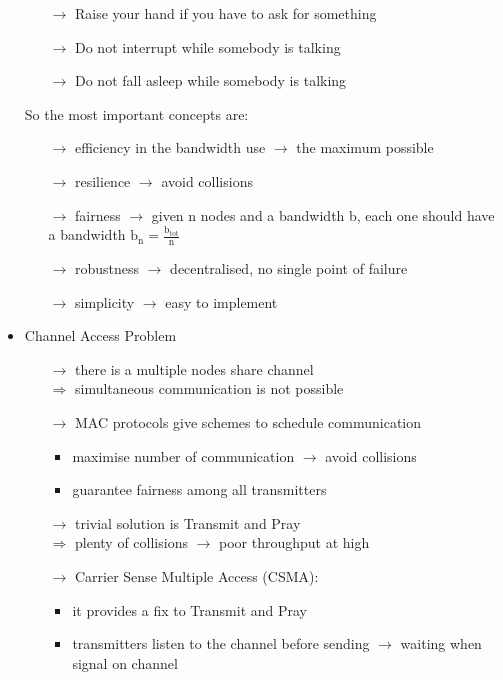 \begin{itemize}
\begin{itemize}
        \item[$\rightarrow$] Raise your hand if you have to ask for something
        \item[$\rightarrow$] Do not interrupt while somebody is talking
        \item[$\rightarrow$] Do not fall asleep while somebody is talking
    \end{itemize}
    So the most important concepts are:
    \begin{itemize}
        \item[$\rightarrow$] efficiency in the bandwidth use $\rightarrow$ the maximum possible
        \item[$\rightarrow$] resilience $\rightarrow$ avoid collisions
        \item[$\rightarrow$] fairness $\rightarrow$ given n nodes and a bandwidth b, each one should have a bandwidth $\text{b}_{\text{n}}=\frac{\text{b}_{\text{tot}}}{\text{n}}$
        \item[$\rightarrow$] robustness $\rightarrow$ decentralised, no single point of failure
        \item[$\rightarrow$] simplicity $\rightarrow$ easy to implement
    \end{itemize}
    \item Channel Access Problem
    \begin{itemize}
        \item[$\rightarrow$] there is a multiple nodes share channel\\
        $\Rightarrow$ simultaneous communication is not possible
        \newpage
        \item[$\rightarrow$] MAC protocols give schemes to schedule communication
        \begin{itemize}
            \item maximise number of communication $\rightarrow$ avoid collisions
            \item guarantee fairness among all transmitters
        \end{itemize}
        \item[$\rightarrow$] trivial solution is Transmit and Pray\\$\Rightarrow$ plenty of collisions $\rightarrow$ poor throughput at high
        \item[$\rightarrow$] Carrier Sense Multiple Access (CSMA):
        \begin{itemize}
            \item it provides a fix to Transmit and Pray
            \item transmitters listen to the channel before sending $\rightarrow$ waiting when signal on channel

\end{itemize}
\end{itemize}
\end{itemize}
